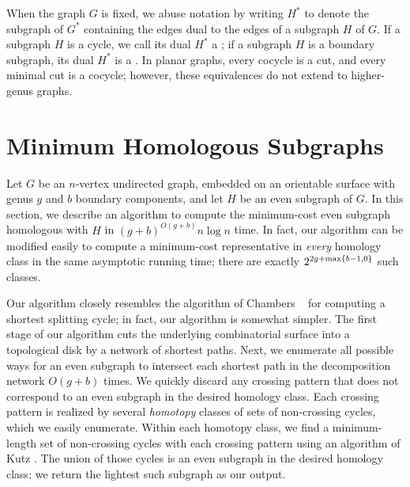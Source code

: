 \documentclass{sig-alternate}
\def\note#1{\EMPH{\color{red} #1}}
\begin{document}
When the graph $G$ is fixed, we abuse notation by writing $H^*$ to denote the subgraph of $G^*$ containing the edges dual to the edges of a subgraph $H$ of $G$.  If a subgraph $H$ is a cycle, we call its dual $H^*$ a ; if a subgraph $H$ is a boundary subgraph, its dual $H^*$ is a .  In planar graphs, every cocycle is a cut, and every minimal cut is a cocycle; however, these equivalences do not extend to higher-genus graphs.


\def\reverse#1{\smash{\overline{#1}}}

\section{Minimum Homologous Subgraphs}

Let $G$ be an $n$-vertex undirected graph, embedded on an orientable
surface with genus $g$ and $b$ boundary components, and let $H$
be an even subgraph of $G$.  In this section, we describe an
algorithm to compute the minimum-cost even subgraph homologous with
$H$ in $(g+b)^{O(g+b)}n\log n$ time.  In fact, our algorithm can be
modified easily to compute a minimum-cost representative in
\emph{every} homology class in the same asymptotic running time;
there are exactly $2^{2g+\max\{ b-1,0 \}}$ such classes.

Our algorithm closely resembles the algorithm of Chambers \etal~\cite{ccelw-scsih-08} for computing a shortest splitting cycle; in fact, our algorithm is somewhat simpler.  The first stage of our algorithm cuts the underlying combinatorial surface into a topological disk by a network of shortest paths.  Next, we enumerate all possible ways for an even subgraph to intersect each shortest path in the decomposition network $O(g+b)$ times.  We quickly discard any crossing pattern that does not correspond to an even subgraph in the desired homology class.  Each crossing pattern is realized by several \emph{homotopy} classes of sets of non-crossing cycles, which we easily enumerate.  Within each homotopy class, we find a minimum-length set of non-crossing cycles with each crossing pattern using an algorithm of Kutz \cite{k-csnco-06}.  The union of those cycles is an even subgraph in the desired homology class; we return the lightest such subgraph as our output.
\end{document}
